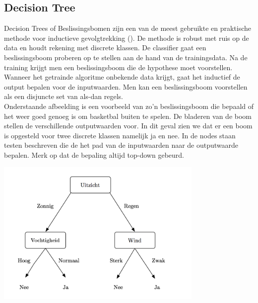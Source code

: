 \subsection{Decision Tree}\label{Decision Tree}
%
Decision Trees of Beslissingsbomen zijn een van de meest gebruikte en praktische methode voor inductieve gevolgtrekking (\cite{mitchell1997machine}). De methode is robust met ruis op de data en houdt rekening met discrete klassen. De classifier gaat een beslissingsboom proberen op te stellen aan de hand van de trainingsdata. Na de training krijgt men een beslissingsboom die de hypothese moet voorstellen. Wanneer het getrainde algoritme onbekende data krijgt, gaat het inductief de output bepalen voor de inputwaarden. Men kan een beslissingsboom voorstellen als een disjuncte set van als-dan regels.\\ 
%
Onderstaande afbeelding is een voorbeeld van zo'n beslissingsboom die bepaald of het weer goed genoeg is om basketbal buiten te spelen. De bladeren van de boom stellen de verschillende outputwaarden voor. In dit geval zien we dat er een boom is opgesteld voor twee discrete klassen namelijk ja en nee. In de nodes staan testen beschreven die de het pad van de inputwaarden naar de outputwaarde bepalen. Merk op dat de bepaling altijd top-down gebeurd.
%
\begin{center}
  \includegraphics[width=10cm]{decisiontree}
  \label{fig:beslissingsboom}
\end{center}
